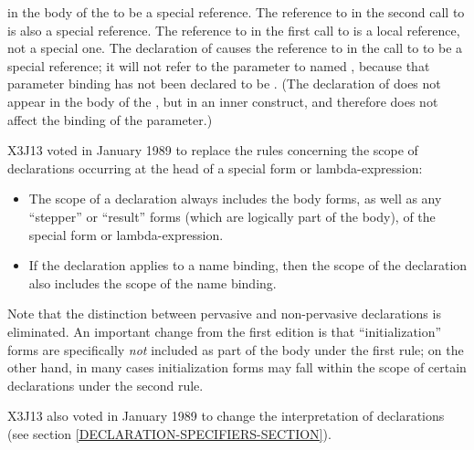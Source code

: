 \begin{defspec}
in the body of the  to be a special reference.
The reference to  in the second call to  is also a special
reference.
The reference to  in the first call to  is a local
reference, not a special one.  The  declaration of 
causes the reference to  in the call
to  to be a special reference; it will not
refer to the parameter to  named , because that
parameter binding has not been declared to be .
(The  declaration of  does not appear in the body
of the , but in an inner construct, and therefore does not
affect the binding of the parameter.)

\begin{new}
X3J13 voted in January 1989
to replace the rules concerning the scope of
declarations occurring at the head of a special form or lambda-expression:
\begin{itemize}
\item The scope of a declaration always includes the body forms, as well as any
``stepper'' or ``result'' forms (which are logically part of the body), of the
special form or lambda-expression.

\item If the declaration applies to a name binding, then the scope of the
declaration also includes the scope of the name binding.
\end{itemize}
Note that
the distinction between pervasive and non-pervasive
declarations is eliminated.  An important change
from the first edition is that ``initialization''
forms are specifically \emph{not} included as part of the body under the first
rule; on the other hand, in many cases initialization forms may fall
within the scope of certain declarations under the second rule.
\end{new}

\begin{new}
X3J13 also voted in January 1989
to change the interpretation
of  declarations (see section \ref{DECLARATION-SPECIFIERS-SECTION}).
\end{new}


\end{defspec}
